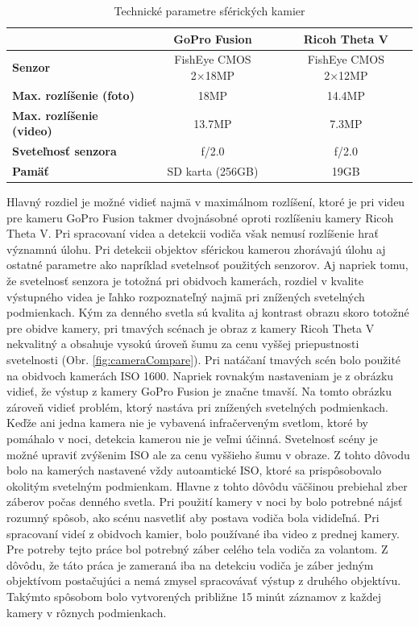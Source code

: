 \documentclass[slovak,master,dept460,male,cpp,cpdeclaration]{diploma}
\begin{document}
\begin{table}[H]
\begin{tabular}{|l|c|c|}
\hline
                                     & \textbf{GoPro Fusion}  & \textbf{Ricoh Theta V} \\ \hline
\textbf{Senzor}                      & FishEye CMOS 2×18MP    & FishEye CMOS 2×12MP    \\ \hline
\textbf{Max. rozlíšenie (foto)}      & 18MP                   & 14.4MP                 \\ \hline
\textbf{Max. rozlíšenie (video)}     & 13.7MP                 & 7.3MP                  \\ \hline
\textbf{Sveteľnosť senzora}          &  f/2.0                 & f/2.0                  \\ \hline
\textbf{Pamäť}                       &  SD karta (256GB)      & 19GB                   \\ \hline
\end{tabular}

	\caption{Technické parametre sférických kamier}
	\label{tab:techSpec}
\end{table}
\newpage
 Hlavný rozdiel je možné vidieť najmä v maximálnom rozlíšení, ktoré je pri videu pre kameru GoPro Fusion takmer dvojnásobné oproti rozlíšeniu kamery Ricoh Theta V. Pri spracovaní videa a detekcii vodiča však nemusí rozlíšenie hrať významnú úlohu. Pri detekcii objektov sférickou kamerou zhorávajú úlohu aj ostatné parametre ako napríklad svetelnsoť použitých senzorov. Aj napriek tomu, že svetelnosť senzora je totožná pri obidvoch kamerách, rozdiel v kvalite výstupného videa je ľahko rozpoznateľný najmä pri znížených svetelných podmienkach. Kým za denného svetla sú kvalita aj kontrast obrazu skoro totožné pre obidve kamery, pri tmavých scénach je obraz z kamery Ricoh Theta V nekvalitný a obsahuje vysokú úroveň šumu za cenu vyššej priepustnosti svetelnosti (Obr. \ref{fig:cameraCompare}). Pri natáčaní tmavých scén bolo použité na obidvoch kamerách ISO 1600. Napriek rovnakým nastaveniam je z obrázku vidieť, že výstup z kamery GoPro Fusion je značne tmavší. Na tomto obrázku zároveň vidieť problém, ktorý nastáva  pri znížených svetelných podmienkach. Keďže ani jedna kamera nie je vybavená infračerveným svetlom, ktoré by pomáhalo v noci, detekcia kamerou  nie je veľmi účinná. Svetelnosť scény je možné upraviť zvýšenim ISO ale za cenu vyššieho šumu v obraze. Z tohto dôvodu bolo na kamerých nastavené vždy autoamtické ISO, ktoré sa prispôsobovalo okolitým svetelným podmienkam. Hlavne z tohto dôvôdu väčšinou prebiehal zber záberov počas denného svetla. Pri  použití kamery v noci by bolo potrebné nájsť rozumný spôsob, ako scénu nasvetliť aby postava vodiča bola vidideľná. Pri spracovaní videí z obidvoch kamier, bolo používané iba video z prednej kamery. Pre potreby tejto práce bol potrebný záber celého tela vodiča za volantom. Z dôvôdu, že táto práca je zameraná iba na detekciu vodiča je záber jedným objektívom postačujúci a nemá zmysel spracovávať výstup z druhého objektívu. Takýmto spôsobom bolo vytvorených približne 15 minút záznamov z každej kamery v rôznych podmienkach.
\end{document}
